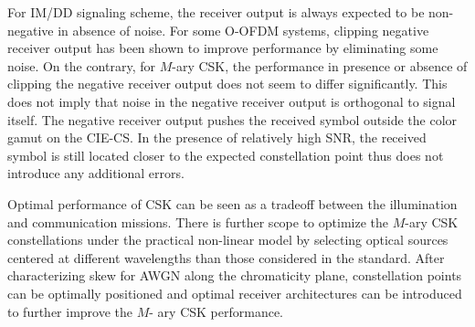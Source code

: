 For IM/DD signaling scheme, the receiver output is always expected to be non-negative in absence of noise. For some O-OFDM systems, clipping negative receiver output has been shown to improve performance by eliminating some noise. On the contrary, for $M$-ary CSK, the performance in presence or absence of clipping the negative receiver output does not seem to differ significantly. This does not imply that noise in the negative receiver output is orthogonal to signal itself. The negative receiver output pushes the received symbol outside the color gamut on the CIE-CS. In the presence of relatively high SNR, the received symbol is still located closer to the expected constellation point thus does not introduce any additional errors.

Optimal performance of CSK can be seen as a tradeoff between the illumination and communication missions. There is further scope to optimize the $M$-ary CSK constellations under the practical non-linear model by selecting optical sources centered at different wavelengths than those considered in the standard. After characterizing skew for AWGN along the chromaticity plane, constellation points can be optimally positioned and optimal receiver architectures can be introduced to further improve the $M$- ary CSK performance.